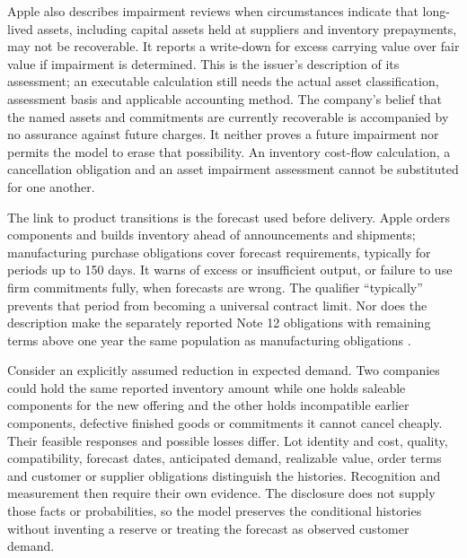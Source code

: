 Apple also describes impairment reviews when circumstances indicate that
long-lived assets, including capital assets held at suppliers and inventory
prepayments, may not be recoverable. It reports a write-down for excess carrying
value over fair value if impairment is determined. This is the issuer's
description of its assessment; an executable calculation still needs the
actual asset classification, assessment basis and applicable accounting method.
The company's belief that the named assets and commitments are currently
recoverable is accompanied by no assurance against future charges. It neither
proves a future impairment nor permits the model to erase that possibility.
An inventory cost-flow calculation, a cancellation obligation and an asset
impairment assessment cannot be substituted for one another.

The link to product transitions is the forecast used before delivery. Apple
orders components and builds inventory ahead of announcements and shipments;
manufacturing purchase obligations cover forecast requirements, typically for
periods up to 150 days. It warns of excess or insufficient output, or failure
to use firm commitments fully, when forecasts are wrong. The qualifier
``typically'' prevents that period from becoming a universal contract limit.
Nor does the description make the separately reported Note 12 obligations
with remaining terms above one year the same population as manufacturing
obligations \citep[Risk Factors, printed p.~9; Note 12, printed p.~45]{apple2024}.

Consider an explicitly assumed reduction in expected demand. Two companies
could hold the same reported inventory amount while one holds saleable
components for the new offering and the other holds incompatible earlier
components, defective finished goods or commitments it cannot cancel cheaply.
Their feasible responses and possible losses differ. Lot identity and cost,
quality, compatibility, forecast dates, anticipated demand, realizable value,
order terms and customer or supplier obligations distinguish the histories.
Recognition and measurement then require their own evidence. The disclosure
does not supply those facts or probabilities, so the model preserves the
conditional histories without inventing a reserve or treating the forecast as
observed customer demand.
